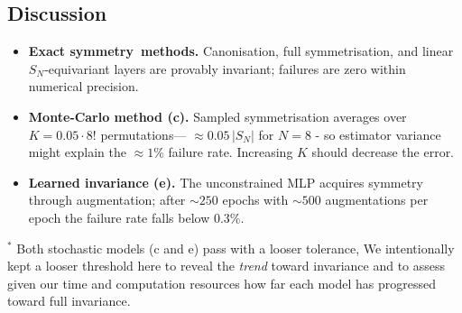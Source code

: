 \subsection*{Discussion}
\begin{itemize}[leftmargin=1.5em,itemsep=0.3em]
	\item \textbf{Exact symmetry methods.}
	Canonisation, full symmetrisation, and linear $S_N$‑equivariant layers are
	provably invariant; failures are zero within numerical precision.
	
	\item \textbf{Monte‑Carlo method (c).}
	Sampled symmetrisation averages over $K=0.05 \cdot 8! $ permutations—
	$\approx0.05\,|S_N|$ for $N=8$ - so estimator variance might explain the
	$\approx1\%$ failure rate.  Increasing $K$ should decrease the error.
	
	\item \textbf{Learned invariance (e).}
	The unconstrained MLP acquires symmetry through augmentation; after
	$\sim250$ epochs with $\sim500$ augmentations per epoch the failure rate falls below $0.3\%$.
\end{itemize}

\vspace{0.3em}
\noindent$^{\ast}$ Both stochastic models (c and e) pass with a looser
tolerance, We intentionally kept a looser threshold here to reveal the \emph{trend}
toward invariance and to assess given our time and computation resources how far each model has progressed toward full
invariance.
